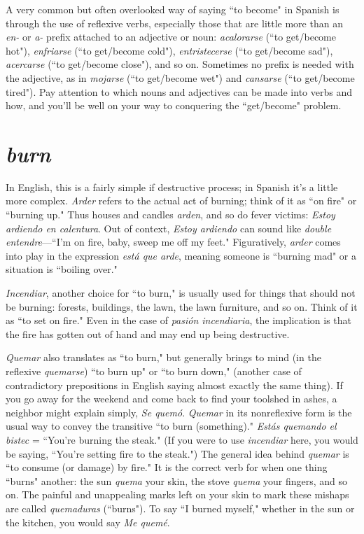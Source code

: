 A very common but often overlooked way of saying ``to become" in Spanish is through the use of reflexive verbs, especially those
that are little more than an \emph{en-} or \emph{a-} prefix attached to an adjective or
noun: \emph{acalorarse} (``to get/become hot"), \emph{enfriarse} (``to get/become
cold"), \emph{entristecerse} (``to get/become sad"), \emph{acercarse} (``to get/become
close"), and so on. Sometimes no prefix is needed with the adjective,
as in \emph{mojarse} (``to get/become wet") and \emph{cansarse} (``to get/become
tired"). Pay attention to which nouns and adjectives can be made into
verbs and how, and you'll be well on your way to conquering the ``get/become" problem.

\section{\emph{burn}}

In English, this is a fairly simple if destructive process; in
Spanish it's a little more complex. \emph{Arder} refers to the actual act of
burning; think of it as ``on fire" or ``burning up." Thus houses and
candles \emph{arden}, and so do fever victims: \emph{Estoy ardiendo en calentura}.
Out of context, \emph{Estoy ardiendo} can sound like \emph{double entendre}---``I'm
on fire, baby, sweep me off my feet." Figuratively, \emph{arder} comes into
play in the expression \emph{está que arde}, meaning someone is ``burning
mad" or a situation is ``boiling over."

\emph{Incendiar}, another choice for ``to burn," is usually used for
things that should not be burning: forests, buildings, the lawn, the
lawn furniture, and so on. Think of it as ``to set on fire." Even in the
case of \emph{pasión incendiaria}, the implication is that the fire has gotten
out of hand and may end up being destructive.

\emph{Quemar} also translates as ``to burn," but generally brings to
mind (in the reflexive \emph{quemarse}) ``to burn up" or ``to burn down," (another case of contradictory prepositions in English saying almost exactly the same thing). If you go away for the weekend and come back
to find your toolshed in ashes, a neighbor might explain simply, \emph{Se
quemó}. \emph{Quemar} in its nonreflexive form is the usual way to convey the
transitive ``to burn (something)." \emph{Estás quemando el bistec} = ``You're
burning the steak." (If you were to use \emph{incendiar} here, you would be
saying, ``You're setting fire to the steak.") The general idea behind \emph{quemar} is ``to consume (or damage) by fire." It is the correct verb for when
one thing ``burns" another: the sun \emph{quema} your skin, the stove \emph{quema}
your fingers, and so on. The painful and unappealing marks left on
your skin to mark these mishaps are called \emph{quemaduras} (``burns"). To
say ``I burned myself," whether in the sun or the kitchen, you would
say \emph{Me quemé}.

